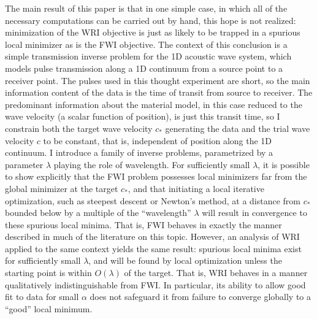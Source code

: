 The main result of this paper is that in one simple case, in which all
of the necessary computations can be carried out by hand, this hope is
not realized: minimization of the WRI objective is just as likely to
be trapped in a spurious local minimizer as is the FWI objective.  The
context of this conclusion is a simple transmission inverse problem
for the 1D acoustic wave system, which models pulse transmission along
a 1D continuum from a source point to a receiver point. The pulses
used in this thought experiment are short, so the main information
content of the data is the time of transit from source to
receiver. The predominant information about the material model, in
this case reduced to the wave velocity (a scalar function of
position), is just this transit time, so I constrain both the target
wave velocity $c_*$ generating the data and the trial wave velocity
$c$ to be constant, that is, independent of position along the 1D
continuum. I introduce a family of inverse problems, parametrized by a
parameter $\lambda$ playing the role of wavelength. For sufficiently small
$\lambda$, it is possible to show explicitly that the FWI problem
possesses local minimizers far from the global minimizer at the target
$c_*$, and that initiating a local iterative optimization, such as
steepest descent or Newton's method, at a distance from $c_*$ bounded
below by a multiple of the ``wavelength'' $\lambda$ will result in
convergence to these spurious local minima. That is, FWI 
behaves in exactly the manner described in much of the literature on
this topic. However, an analysis of WRI applied to the same context
yields the same result: spurious local minima exist for sufficiently
small $\lambda$, and will be found by local optimization unless the
starting point is within $O(\lambda)$ of the target. That is, WRI
behaves in a manner qualitatively indistinguishable from FWI. In
particular, its ability to allow good fit to data for small $\alpha$
does not safeguard it from failure to converge globally to a ``good''
local minimum.

